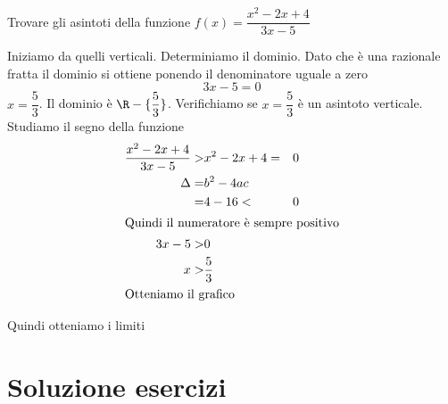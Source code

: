 \begin{exercise}
Trovare gli asintoti della funzione $f(x)=\dfrac{x^2-2x+4}{3x-5}$
	\tcblower

Iniziamo da quelli verticali. Determiniamo il dominio. Dato che è una razionale fratta il dominio si ottiene ponendo il denominatore uguale a zero\[3x-5=0\] $x=\dfrac{5}{3}$. Il dominio è $\R-\lbrace\dfrac{5}{3}\rbrace$. Verifichiamo se $x=\dfrac{5}{3}$ è un asintoto verticale. Studiamo il segno della funzione
\begin{align*}
\dfrac{x^2-2x+4}{3x-5}>&
x^2-2x+4=&0\\
\Delta=&b^2-4ac\\
=&4-16<&0\\
\intertext{Quindi il numeratore è sempre positivo}
3x-5>&0\\
x>&\dfrac{5}{3}\\
\intertext{Otteniamo il grafico}
\end{align*}
	\begin{center}
	
\end{center}
Quindi otteniamo i limiti

\end{exercise}

\tcbstoprecording
\newpage
\section{Soluzione esercizi}
\tcbinputrecords
